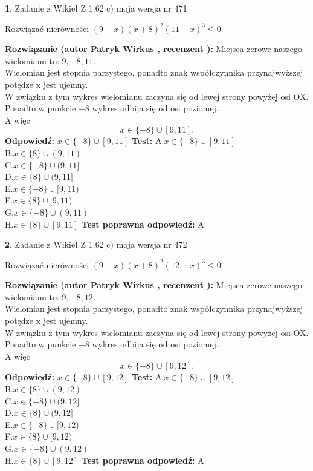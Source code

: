 \documentclass[12pt, a4paper]{article}
\theoremstyle{definition} %
\newtheorem{zad}{}
\newcommand{\zadStart}[1]{\begin{zad}#1\newline}
\newcommand{\zadStop}{\end{zad}}
\newcommand{\rozwStart}[2]{\noindent \textbf{Rozwiązanie (autor #1 , recenzent #2): }\newline}
\newcommand{\rozwStop}{\newline}
\newcommand{\odpStart}{\noindent \textbf{Odpowiedź:}\newline}
\newcommand{\odpStop}{\newline}
\newcommand{\testStart}{\noindent \textbf{Test:}\newline}
\newcommand{\testStop}{\newline}
\newcommand{\kluczStart}{\noindent \textbf{Test poprawna odpowiedź:}\newline}
\newcommand{\kluczStop}{\newline}
\begin{document}
\zadStart{Zadanie z Wikieł Z 1.62 c) moja wersja nr 471}

Rozwiązać nierówności $(9-x)(x+8)^{2}(11-x)^{3}\le0$.
\zadStop
\rozwStart{Patryk Wirkus}{}
Miejsca zerowe naszego wielomianu to: $9, -8, 11$.\\
Wielomian jest stopnia parzystego, ponadto znak współczynnika przy\linebreak najwyższej potędze x jest ujemny.\\ W związku z tym wykres wielomianu zaczyna się od lewej strony powyżej osi OX.\\
Ponadto w punkcie $-8$ wykres odbija się od osi poziomej.\\
A więc $$x \in \{-8\} \cup [9,11].$$
\rozwStop
\odpStart
$x \in \{-8\} \cup [9,11]$
\odpStop
\testStart
A.$x \in \{-8\} \cup [9,11]$\\
B.$x \in \{8\} \cup (9,11)$\\
C.$x \in \{-8\} \cup (9,11]$\\
D.$x \in \{8\} \cup (9,11]$\\
E.$x \in \{-8\} \cup [9,11)$\\
F.$x \in \{8\} \cup [9,11)$\\
G.$x \in \{-8\} \cup (9,11)$\\
H.$x \in \{8\} \cup [9,11]$
\testStop
\kluczStart
A
\kluczStop



\zadStart{Zadanie z Wikieł Z 1.62 c) moja wersja nr 472}

Rozwiązać nierówności $(9-x)(x+8)^{2}(12-x)^{3}\le0$.
\zadStop
\rozwStart{Patryk Wirkus}{}
Miejsca zerowe naszego wielomianu to: $9, -8, 12$.\\
Wielomian jest stopnia parzystego, ponadto znak współczynnika przy\linebreak najwyższej potędze x jest ujemny.\\ W związku z tym wykres wielomianu zaczyna się od lewej strony powyżej osi OX.\\
Ponadto w punkcie $-8$ wykres odbija się od osi poziomej.\\
A więc $$x \in \{-8\} \cup [9,12].$$
\rozwStop
\odpStart
$x \in \{-8\} \cup [9,12]$
\odpStop
\testStart
A.$x \in \{-8\} \cup [9,12]$\\
B.$x \in \{8\} \cup (9,12)$\\
C.$x \in \{-8\} \cup (9,12]$\\
D.$x \in \{8\} \cup (9,12]$\\
E.$x \in \{-8\} \cup [9,12)$\\
F.$x \in \{8\} \cup [9,12)$\\
G.$x \in \{-8\} \cup (9,12)$\\
H.$x \in \{8\} \cup [9,12]$
\testStop
\kluczStart
A
\kluczStop
\end{document}

